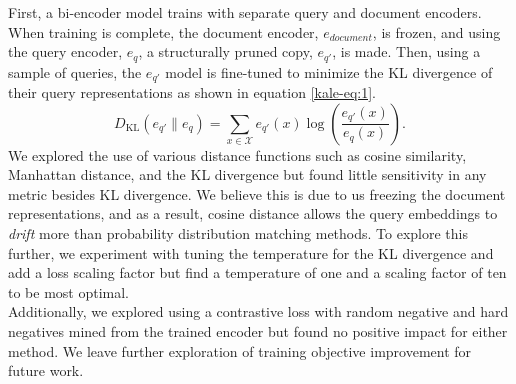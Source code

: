 First, a bi-encoder model trains with separate query and document encoders. When training is complete, the document encoder, $e_{document}$, is frozen, and using the query encoder, $e_{q}$, a structurally pruned copy, $e_{q'}$, is made. Then, using a sample of queries, the $e_{q'}$ model is fine-tuned to minimize the KL divergence of their query representations as shown in equation \ref{kale-eq:1}. \\
\begin{equation}\label{kale-eq:1} 
    \displaystyle D_{\text{KL}}(e_{q'} \parallel e_{q} )= \sum _{x\in {\mathcal {X}}}e_{q'}(x)\log \left({\frac {e_{q'}(x)}{e_{q}(x)}}\right).
\end{equation}
We explored the use of various distance functions such as cosine similarity, Manhattan distance, and the KL divergence but found little sensitivity in any metric besides KL divergence. We believe this is due to us freezing the document representations, and as a result, cosine distance allows the query embeddings to \textit{drift} more than probability distribution matching methods. To explore this further, we experiment with tuning the temperature for the KL divergence and add a loss scaling factor but find a temperature of one and a scaling factor of ten to be most optimal. \\
Additionally, we explored using a contrastive loss with random negative and hard negatives mined from the trained encoder but found no positive impact for either method. We leave further exploration of training objective improvement for future work.

